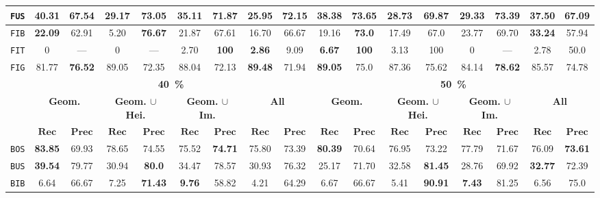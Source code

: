 \begin{sidewaystable}
\begin{center}
\begin{tabular}{|c | c c | c c | c c | c c || c c | c c | c c | c c |}
                    \hline
                    \texttt{FUS} & \textbf{40.31} & 67.54 & 29.17 & \textbf{73.05} & 35.11 & 71.87 & 25.95 & 72.15 & \textbf{38.38} & \textbf{73.65} & 28.73 & 69.87 & 29.33 & 73.39 & 37.50 & 67.09 \\
                    \hline
                    \texttt{FIB} & \textbf{22.09} & 62.91 & 5.20 & \textbf{76.67} & 21.87 & 67.61 & 16.70 & 66.67 & 19.16 & \textbf{73.0} & 17.49 & 67.0 & 23.77 & 69.70 & \textbf{33.24} & 57.94 \\
                    \hline
                    \texttt{FIT} & 0 & --- & 0 & --- & 2.70 & \textbf{100} & \textbf{2.86} & 9.09 & \textbf{6.67} & \textbf{100} & 3.13 & 100 & 0 & --- & 2.78 & 50.0 \\
                    \hline
                    \texttt{FIG} & 81.77 & \textbf{76.52} & 89.05 & 72.35 & 88.04 & 72.13 & \textbf{89.48} & 71.94 & \textbf{89.05} & 75.0 & 87.36 & 75.62 & 84.14 & \textbf{78.62} & 85.57 & 74.78 \\
                    \hline
                    \hline
                    & \multicolumn{8}{c||}{\textbf{\SI{40}{\percent}}} & \multicolumn{8}{c|}{\textbf{\SI{50}{\percent}}}\\
                    \hline
                    &\multicolumn{2}{c|}{\textbf{Geom.}} & \multicolumn{2}{c|}{\textbf{Geom. $\cup$ Hei.}} & \multicolumn{2}{c|}{\textbf{Geom. $\cup$ Im.}} & \multicolumn{2}{c||}{\textbf{All}} & \multicolumn{2}{c|}{\textbf{Geom.}} & \multicolumn{2}{c|}{\textbf{Geom. $\cup$ Hei.}} & \multicolumn{2}{c|}{\textbf{Geom. $\cup$ Im.}} & \multicolumn{2}{x{1.5cm}|}{\textbf{All}}\\
                    \cline{2-17}
                    & $\bm{Rec}$ & $\bm{Prec}$ &  $\bm{Rec}$ & $\bm{Prec}$ &  $\bm{Rec}$ & $\bm{Prec}$ &  $\bm{Rec}$ & $\bm{Prec}$ & $\bm{Rec}$ & $\bm{Prec}$ &  $\bm{Rec}$ & $\bm{Prec}$ &  $\bm{Rec}$ & $\bm{Prec}$ &  $\bm{Rec}$ & $\bm{Prec}$ \\
                    \hline
                    \texttt{BOS} & \textbf{83.85} & 69.93 & 78.65 & 74.55 & 75.52 & \textbf{74.71} & 75.80 & 73.39 & \textbf{80.39} & 70.64 & 76.95 & 73.22 & 77.79 & 71.67 & 76.09 & \textbf{73.61} \\
                    \hline
                    \texttt{BUS} & \textbf{39.54} & 79.77 & 30.94 & \textbf{80.0} & 34.47 & 78.57 & 30.93 & 76.32 & 25.17 & 71.70 & 32.58 & \textbf{81.45} & 28.76 & 69.92 & \textbf{32.77} & 72.39 \\
                    \hline
                    \texttt{BIB} & 6.64 & 66.67 & 7.25 & \textbf{71.43} & \textbf{9.76} & 58.82 & 4.21 & 64.29 & 6.67 & 66.67 & 5.41 & \textbf{90.91} & \textbf{7.43} & 81.25 & 6.56 & 75.0 \\

\end{tabular}
\end{center}
\end{sidewaystable}
